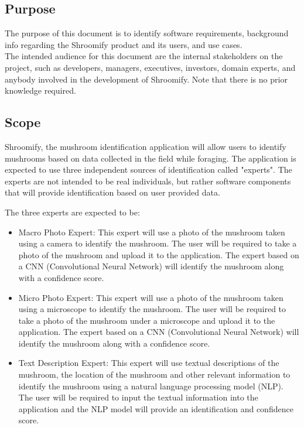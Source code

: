 \documentclass{article}
\begin{document}
\subsection{Purpose}
\label{sub:purpose}
The purpose of this document is to identify software requirements, background info regarding the Shroomify product and its users, and use cases. \\

The intended audience for this document are the internal stakeholders on the project, such as developers, managers, executives, investors, domain experts, and anybody involved in the development of Shroomify. Note that there is no prior knowledge required.  


\subsection{Scope}


Shroomify, the mushroom identification application will allow users to identify mushrooms based on data collected in the field while foraging. The application is expected to use three
independent sources of identification called "experts". The experts are not intended to be real individuals, but rather software components that will provide identification based on user provided data. 

\vspace{0.5cm}
\noindent
The three experts are expected to be:

\begin{itemize}
	\item Macro Photo Expert: This expert will use a photo of the mushroom taken using a camera to identify the mushroom. The user will be required to take a photo of the mushroom and upload it to the application. The expert based on a CNN (Convolutional Neural Network) will identify the mushroom along with a confidence score.
	\item Micro Photo Expert: This expert will use a photo of the mushroom taken using a microscope to identify the mushroom. The user will be required to take a photo of the mushroom under a microscope and upload it to the application. The expert based on a CNN (Convolutional Neural Network) will identify the mushroom along with a confidence score.
	\item Text Description Expert: This expert will use textual descriptions of the mushroom, the location of the mushroom and other relevant information to identify the mushroom using a natural language processing model (NLP). The user will be required to input the textual information into the application and the NLP model will provide an identification and confidence score. 
\end{itemize}
\end{document}
